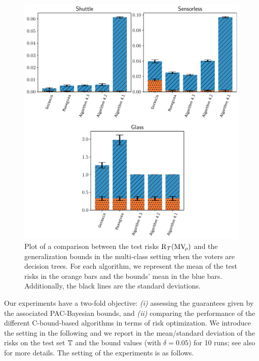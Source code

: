 \begin{figure}
    \centering
    \includegraphics[width=1.0\linewidth]{chapter_4/figures/tree_multi_2.pdf}
    \caption[Comparison Between the Test Risks and the Bounds (6/6)]{
    Plot of a comparison between the test risks $\text{R}_{\mathcal{T}}(\text{MV}_{\!\rho})$ and the generalization bounds in the multi-class setting when the voters are decision trees.
    For each algorithm, we represent the mean of the test risks in the orange bars and the bounds' mean in the blue bars.
    Additionally, the black lines are the standard deviations. 
    }
    \label{chap:mv:fig:tree-multi-2}
\end{figure}

Our experiments have a two-fold objective: \textit{(i)} assessing the guarantees given by the associated PAC-Bayesian bounds, and \textit{(ii)} comparing the performance of the different C-bound-based algorithms in terms of risk optimization.
We introduce the setting in the following and we report in  the mean/standard deviation of the risks on the test set $\mathbb{T}$ and the bound values (with $\delta=0.05$) for 10 runs; see also  for more details.
The setting of the experiments is as follows.

